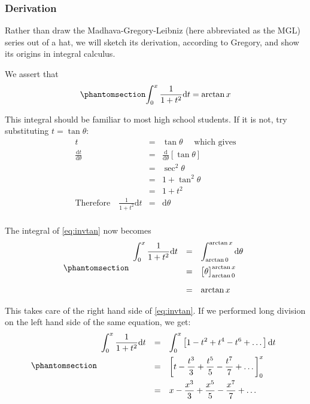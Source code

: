 \documentclass[
  a4paper,
]{article}
\begin{document}
\subsubsection{Derivation}\label{derivation}

Rather than draw the Madhava-Gregory-Leibniz (here abbreviated as the
MGL) series out of a hat, we will sketch its derivation, according to
Gregory, and show its origins in integral calculus.

We assert that \begin{equation}\phantomsection\label{eq:invtan}{
\int_{0}^{x}\frac{1}{1+ t^2}{\mathrm{d}} t = \arctan{x}
}\end{equation}

This integral should be familiar to most high school students. If it is
not, try substituting \(t = \tan \theta\): \[
\begin{array}{rcl}
t & = & \tan \theta \quad \mbox{ which gives} \\
\displaystyle \frac{\mathrm{d}t}{\mathrm{d}\theta} & = & \displaystyle \frac{\mathrm{d}}{\mathrm{d}\theta}\left[ \tan \theta \right] \\
& = & \sec^2 \theta \\
& = & 1 + \tan^2 \theta \\
& = & 1 + t^2\\
\mbox{Therefore}\quad\frac{1}{1 + t^2}\mathrm{d} t & = & \mathrm{d}\theta\\
\end{array}
\]

The integral of \cref{eq:invtan} now becomes
\begin{equation}\phantomsection\label{eq:right}{
\begin{array}{rcl}
\displaystyle \int_{0}^{x}\frac{1}{1+ t^2}\mathrm{d}t %
& = & \displaystyle \int_{\arctan0}^{\arctan x} \mathrm{d}\theta\\[1em]
& = & \big[ \theta\big]^{\arctan x}_{\arctan0} \\[1em]
& = & \arctan x
\end{array}
}\end{equation}

This takes care of the right hand side of \cref{eq:invtan}. If we
performed long division on the left hand side of the same equation, we
get: \begin{equation}\phantomsection\label{eq:left}{
\begin{array}{rcl}
\displaystyle \int_{0}^{x}\frac{1}{1+ t^2}\mathrm{d}t %
& = & \displaystyle \int_{0}^{x}%
\left[ 1 - t^2 + t^4 - t^6 +\dots \right] \mathrm{d}t \\[1em]
& = & \displaystyle \left[ t - \frac{t^3}{3} + \frac{t^5}{5} - \frac{t^7}{7}+ \dots \right]_{0}^{x}\\[1em]
& = & \displaystyle x - \frac{x^3}{3} + \frac{x^5}{5} - \frac{x^7}{7}+ \dots
\end{array}
}\end{equation}
\end{document}
